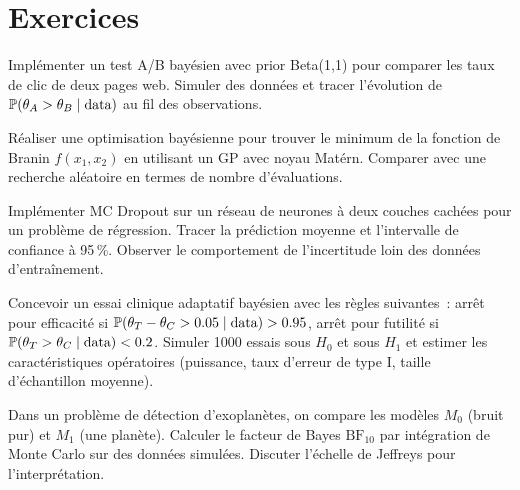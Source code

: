 \section{Exercices}

\begin{exercice}
Impl\'ementer un test A/B bay\'esien avec prior Beta(1,1) pour comparer
les taux de clic de deux pages web. Simuler des donn\'ees et tracer
l'\'evolution de $\mathbb{P}(\theta_A > \theta_B \mid \text{data})$ au fil des
observations.
\end{exercice}

\begin{exercice}
R\'ealiser une optimisation bay\'esienne pour trouver le minimum de la
fonction de Branin $f(x_1, x_2)$ en utilisant un GP avec noyau Mat\'ern.
Comparer avec une recherche al\'eatoire en termes de nombre d'\'evaluations.
\end{exercice}

\begin{exercice}
Impl\'ementer MC Dropout sur un r\'eseau de neurones \`a deux couches cach\'ees
pour un probl\`eme de r\'egression. Tracer la pr\'ediction moyenne et
l'intervalle de confiance \`a 95\,\%. Observer le comportement de
l'incertitude loin des donn\'ees d'entra\^inement.
\end{exercice}

\begin{exercice}
Concevoir un essai clinique adaptatif bay\'esien avec les r\`egles suivantes~:
arr\^et pour efficacit\'e si $\mathbb{P}(\theta_T - \theta_C > 0.05 \mid \text{data}) > 0.95$,
arr\^et pour futilit\'e si $\mathbb{P}(\theta_T > \theta_C \mid \text{data}) < 0.2$.
Simuler 1000 essais sous $H_0$ et sous $H_1$ et estimer les caract\'eristiques
op\'eratoires (puissance, taux d'erreur de type I, taille d'\'echantillon moyenne).
\end{exercice}

\begin{exercice}
Dans un probl\`eme de d\'etection d'exoplan\`etes, on compare les mod\`eles
$M_0$ (bruit pur) et $M_1$ (une plan\`ete). Calculer le facteur de Bayes
$\mathrm{BF}_{10}$ par int\'egration de Monte Carlo sur des donn\'ees simul\'ees.
Discuter l'\'echelle de Jeffreys pour l'interpr\'etation.
\end{exercice}
